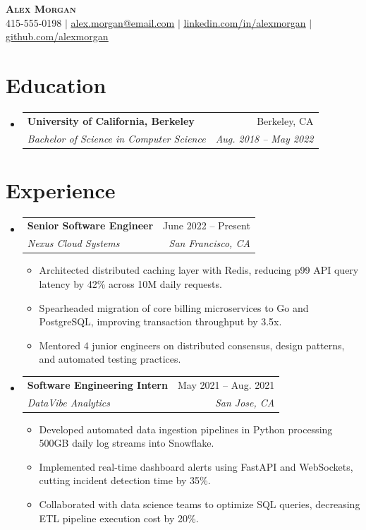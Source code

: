 \documentclass[letterpaper,11pt]{article}
\makeatletter
\newcommand{\resumeItem}[1]{
  \item\small{
    {#1 \vspace{-2pt}}
  }
}
\newcommand{\resumeSubheading}[4]{
  \vspace{-2pt}\item
    \begin{tabular*}{0.97\textwidth}[t]{l@{\extracolsep{\fill}}r}
      \textbf{#1} & #2 \\
      \textit{\small#3} & \textit{\small #4} \\
    \end{tabular*}\vspace{-7pt}
}
\newcommand{\resumeSubHeadingListStart}{\begin{itemize}[leftmargin=0.15in, label={}]}
\newcommand{\resumeSubHeadingListEnd}{\end{itemize}}
\newcommand{\resumeItemListStart}{\begin{itemize}}
\newcommand{\resumeItemListEnd}{\end{itemize}\vspace{-5pt}}
\makeatother
\begin{document}
\begin{center}
    \textbf{\Huge \scshape Alex Morgan} \\ \vspace{1pt}
    \small 415-555-0198 $|$ \href{mailto:alex.morgan@email.com}{\underline{alex.morgan@email.com}} $|$ 
    \href{https://linkedin.com/in/alexmorgan}{\underline{linkedin.com/in/alexmorgan}} $|$
    \href{https://github.com/alexmorgan}{\underline{github.com/alexmorgan}}
\end{center}


\section{Education}
  \resumeSubHeadingListStart
    \resumeSubheading
      {University of California, Berkeley}{Berkeley, CA}
      {Bachelor of Science in Computer Science}{Aug. 2018 -- May 2022}
  \resumeSubHeadingListEnd


\section{Experience}
  \resumeSubHeadingListStart

    \resumeSubheading
      {Senior Software Engineer}{June 2022 -- Present}
      {Nexus Cloud Systems}{San Francisco, CA}
      \resumeItemListStart
        \resumeItem{Architected distributed caching layer with Redis, reducing p99 API query latency by 42\% across 10M daily requests.}
        \resumeItem{Spearheaded migration of core billing microservices to Go and PostgreSQL, improving transaction throughput by 3.5x.}
        \resumeItem{Mentored 4 junior engineers on distributed consensus, design patterns, and automated testing practices.}
      \resumeItemListEnd

    \resumeSubheading
      {Software Engineering Intern}{May 2021 -- Aug. 2021}
      {DataVibe Analytics}{San Jose, CA}
      \resumeItemListStart
        \resumeItem{Developed automated data ingestion pipelines in Python processing 500GB daily log streams into Snowflake.}
        \resumeItem{Implemented real-time dashboard alerts using FastAPI and WebSockets, cutting incident detection time by 35\%.}
        \resumeItem{Collaborated with data science teams to optimize SQL queries, decreasing ETL pipeline execution cost by 20\%.}
      \resumeItemListEnd

  \resumeSubHeadingListEnd
\end{document}

